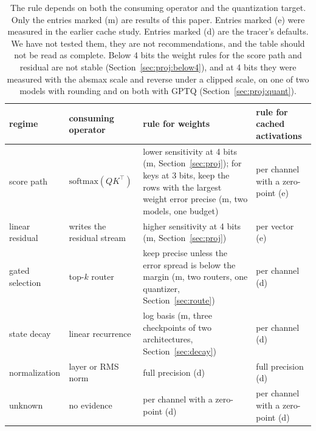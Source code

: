 \documentclass[journal,onecolumn]{IEEEtran}
\begin{document}
\begin{table}[h]
\centering
\caption{The rule depends on both the consuming operator and the quantization target. Only the
entries marked (m) are results of this paper. Entries marked (e) were measured in the earlier
cache study. Entries marked (d) are the tracer's defaults. We have not tested them, they are not
recommendations, and the table should not be read as complete. Below 4 bits the weight rules for the score path
and residual are not stable (Section~\ref{sec:proj:below4}), and at 4 bits they were measured
with the absmax scale and reverse under a clipped scale, on one of two models with
rounding and on both with GPTQ
(Section~\ref{sec:proj:quant}).}
\label{tab:regimes}
\small
\begin{tabular}{p{2.4cm}p{3.0cm}p{4.3cm}p{4.3cm}}
\toprule
regime & consuming operator & rule for weights & rule for cached activations \\
\midrule
score path & $\mathrm{softmax}(QK^\top)$ & lower sensitivity at 4 bits (m, Section~\ref{sec:proj}); for keys at 3 bits, keep the rows with the largest weight error precise (m, two models, one budget) & per channel with a zero-point (e) \\
linear residual & writes the residual stream & higher sensitivity at 4 bits (m, Section~\ref{sec:proj}) & per vector (e) \\
gated selection & top-$k$ router & keep precise unless the error spread is below the margin (m, two routers, one quantizer, Section~\ref{sec:route}) & per channel (d) \\
state decay & linear recurrence & log basis (m, three checkpoints of two architectures, Section~\ref{sec:decay}) & per channel (d) \\
normalization & layer or RMS norm & full precision (d) & full precision (d) \\
unknown & no evidence & per channel with a zero-point (d) & per channel with a zero-point (d) \\
\bottomrule
\end{tabular}
\end{table}
\end{document}
